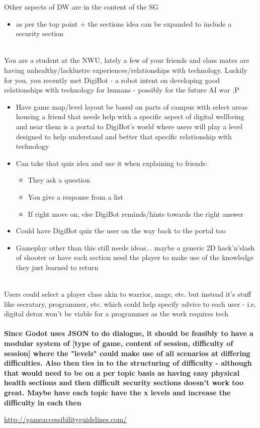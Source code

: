 \documentclass[a4paper]{scrreprt}
\begin{document}
Other aspects of DW are in the content of the SG 
\begin{itemize}
\item as per the top point + the sections idea can be expanded to include a security section 
\end{itemize}\noindent
\\
You are a student at the NWU, lately a few of your friends and class mates are having unhealthy/lacklustre experiences/relationships with technology. Luckily for you, you recently met DigiBot - a robot intent on developing good relationships with technology for humans - possibly for the future AI war ;P 
\begin{itemize}
\item Have game map/level layout be based on parts of campus with select areas housing a friend that needs help with  a specific aspect of digital wellbeing and near them is a portal to DigiBot's world where users will play a level designed to help understand and better that specific relationship with technology
\item Can take that quiz idea and use it when explaining to friends: 
\begin{itemize}
\item They ask a question
\item You give a response from a list
\item If right move on, else DigiBot reminds/hints towards the right answer

\end{itemize}
\item Could have DigiBot quiz the user on the way back to the portal too
\item Gameplay other than this still needs ideas... maybe a generic 2D hack'n'slash of shooter or have each section need the player to make use of the knowledge they just learned to return
\end{itemize}\noindent
\\
Users could select a player class akin to warrior, mage, etc. but instead it's stuff like secratary, programmer, etc. which  could help specify advice to each user - i.e. digital detox won't be viable for a programmer as the work requires tech
\\\\
\textbf{Since Godot uses JSON to do dialogue, it should be feasibly to have a modular system of [type of game, content of session, difficulty of session] where the "levels" could make use of all scenarios at differing difficulties. Also then ties in to the structuring of difficulty - although that would need to be on a per topic basis as having easy physical health sections and then difficult security sections doesn't work too great. Maybe have each topic have the x levels and increase the difficulty in each then}

\url{http://gameaccessibilityguidelines.com/}


%
%
\end{document}
